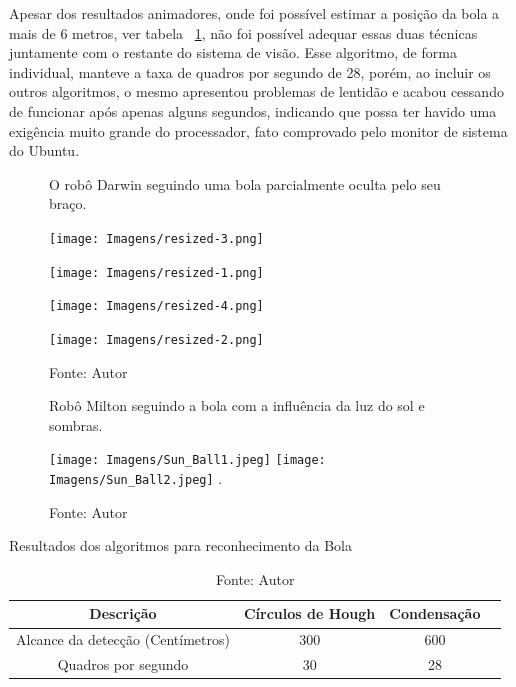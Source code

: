 Apesar dos resultados animadores, onde foi possível estimar a posição da bola a mais de 6 metros, ver tabela ~\ref{Tab:ResBola}, não foi possível adequar essas duas técnicas juntamente com o restante do sistema de visão. Esse algoritmo, de forma individual, manteve a taxa de quadros por segundo de 28, porém, ao incluir os outros algoritmos, o mesmo apresentou problemas de lentidão e acabou cessando de funcionar após apenas alguns segundos, indicando que possa ter havido uma exigência muito grande do processador, fato comprovado pelo monitor de sistema do Ubuntu.

\begin{figure}[!ht]
\centering \caption{O robô Darwin seguindo uma bola parcialmente oculta pelo seu braço.}%

\parbox{2.5in}{\texttt{[image: Imagens/resized-3.png]}} 
\qquad 
\begin{minipage}{2.5in}%
\texttt{[image: Imagens/resized-1.png]}
\end{minipage}
\vspace*{3mm}

\parbox{2.5in}{\texttt{[image: Imagens/resized-4.png]}} 
\qquad
\begin{minipage}{2.5in}%
\texttt{[image: Imagens/resized-2.png]}
\end{minipage}%

\caption*{Fonte: Autor}%
\label{fig:occluded}%
\end{figure}


\begin{figure}[!ht]
\centering \caption{Robô Milton seguindo a bola com a influência da luz do sol e sombras.}
\texttt{[image: Imagens/Sun\_Ball1.jpeg]}
\texttt{[image: Imagens/Sun\_Ball2.jpeg]}
\DeclareGraphicsExtensions.
\caption*{Fonte: Autor}
\label{Fig:SegBall}
\end{figure}


\begin{table}[ht!]
    \caption{Resultados dos algoritmos para reconhecimento da Bola} \label{tbl:Bola}
    \centering
    \begin{tabular}{|c|c|c|c|}
    \hline 
    Descrição & Círculos de Hough & Condensação\\ 
    \hline 
    Alcance da detecção (Centímetros) & 300 & 600\\ 
    \hline 
    Quadros por segundo & 30 & 28\\ 
    \hline 
    \end{tabular}
    \caption*{Fonte: Autor}
    \label{Tab:ResBola}
\end{table}

